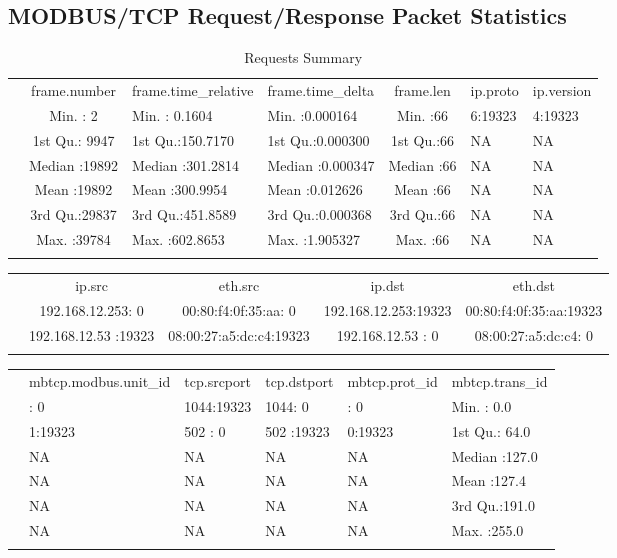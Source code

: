\documentclass[11pt,]{article}
\begin{document}
\subsection*{MODBUS/TCP Request/Response Packet
Statistics}\label{modbustcp-requestresponse-packet-statistics}

\begin{longtable}[c]{@{}lcllcll@{}}
\toprule\addlinespace
& frame.number & frame.time\_relative & frame.time\_delta & frame.len &
ip.proto & ip.version
\\\addlinespace
\midrule\endhead
& Min. : 2 & Min. : 0.1604 & Min. :0.000164 & Min. :66 & 6:19323 &
4:19323
\\\addlinespace
& 1st Qu.: 9947 & 1st Qu.:150.7170 & 1st Qu.:0.000300 & 1st Qu.:66 & NA
& NA
\\\addlinespace
& Median :19892 & Median :301.2814 & Median :0.000347 & Median :66 & NA
& NA
\\\addlinespace
& Mean :19892 & Mean :300.9954 & Mean :0.012626 & Mean :66 & NA & NA
\\\addlinespace
& 3rd Qu.:29837 & 3rd Qu.:451.8589 & 3rd Qu.:0.000368 & 3rd Qu.:66 & NA
& NA
\\\addlinespace
& Max. :39784 & Max. :602.8653 & Max. :1.905327 & Max. :66 & NA & NA
\\\addlinespace
\bottomrule
\addlinespace
\caption{Requests Summary}
\end{longtable}

\begin{longtable}[c]{@{}lcccc@{}}
\toprule\addlinespace
& ip.src & eth.src & ip.dst & eth.dst
\\\addlinespace
\midrule\endhead
& 192.168.12.253: 0 & 00:80:f4:0f:35:aa: 0 & 192.168.12.253:19323 &
00:80:f4:0f:35:aa:19323
\\\addlinespace
& 192.168.12.53 :19323 & 08:00:27:a5:dc:c4:19323 & 192.168.12.53 : 0 &
08:00:27:a5:dc:c4: 0
\\\addlinespace
\bottomrule
\end{longtable}

\begin{longtable}[c]{@{}llllll@{}}
\toprule\addlinespace
& mbtcp.modbus.unit\_id & tcp.srcport & tcp.dstport & mbtcp.prot\_id &
mbtcp.trans\_id
\\\addlinespace
\midrule\endhead
& : 0 & 1044:19323 & 1044: 0 & : 0 & Min. : 0.0
\\\addlinespace
& 1:19323 & 502 : 0 & 502 :19323 & 0:19323 & 1st Qu.: 64.0
\\\addlinespace
& NA & NA & NA & NA & Median :127.0
\\\addlinespace
& NA & NA & NA & NA & Mean :127.4
\\\addlinespace
& NA & NA & NA & NA & 3rd Qu.:191.0
\\\addlinespace
& NA & NA & NA & NA & Max. :255.0
\\\addlinespace
\bottomrule
\end{longtable}
\end{document}
